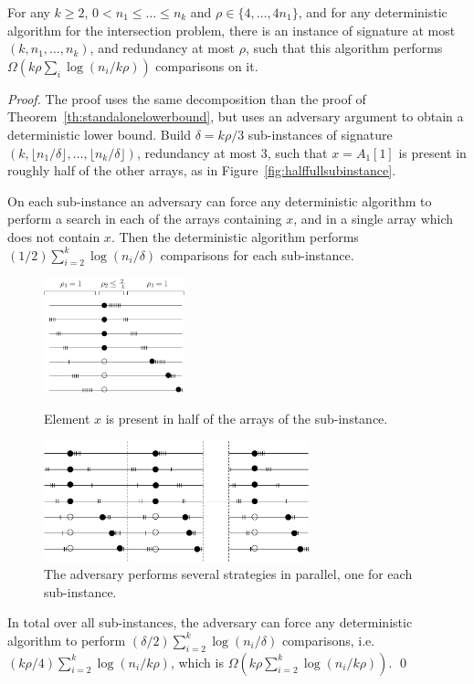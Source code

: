 %
\begin{theorem}\label{th:finer}
For any $k\geq 2$, $0{<}n_1{\leq}\ldots{\leq}n_k$ and
$\rho\in\{4,\ldots,4n_1\}$, 
%
and for any deterministic algorithm for the intersection problem,
%
there is an instance of signature at most $(k,n_1,\ldots,n_k)$, and
redundancy at most $\rho$,
%
such that this algorithm performs $\Omega(k\rho\sum_i\log(n_i/k\rho))$
comparisons on it.
\end{theorem}
\begin{proof}
The proof uses the same decomposition than the proof of
Theorem~\ref{th:standalonelowerbound}, but uses an adversary argument
to obtain a deterministic lower bound.
%
Build $\delta={k\rho/3}$ sub-instances of signature
$(k,\lfloor{n_1/\delta}\rfloor,\ldots,\lfloor{n_k/\delta}\rfloor)$,
redundancy at most $3$, such that $x=A_1[1]$ is present in
roughly half of the other arrays, as in
Figure~\ref{fig:halffullsubinstance}.



On each sub-instance an adversary can force any deterministic algorithm
to perform a search in each of the arrays containing $x$, and in a
single array which does not contain $x$.
%
Then the deterministic algorithm performs
$(1/2)\sum_{i=2}^k\log{(n_i/\delta)}$ comparisons for each
sub-instance.
%
\begin{figure}
\hfill
\begin{minipage}{0.33\textwidth}
\centerline{\includegraphics[angle=0,height=3.3cm]{halffullsubinstance.eps}}
\caption{Element $x$ is present in half of the arrays of the sub-instance.\label{fig:halffullsubinstance}
}
\end{minipage}
\hfill
\begin{minipage}{0.66\textwidth}
\centerline{\includegraphics[angle=0,height=3.5cm]{halffullinstance.eps}}
\caption{The adversary performs several strategies in parallel, one
for each
sub-instance. \label{fig:halffullinstance}}\end{minipage}\hfill \hfill
\hfill \hfill
\end{figure}
%
In total over all sub-instances, the adversary can force any
deterministic algorithm to perform
${(\delta/2)}\sum_{i=2}^k\log{(n_i/\delta)}$ comparisons, i.e.
${(k\rho/4)}\sum_{i=2}^k\log{(n_i/k\rho)}$, which is
$\Omega({k\rho}\sum_{i=2}^k\log{(n_i/k\rho)})$.
\qed\end{proof}
